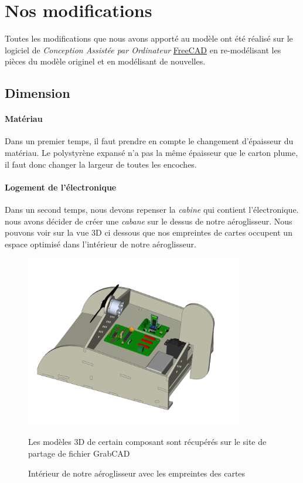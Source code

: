 		\section{Nos modifications}
		Toutes les modifications que nous avons apporté au modèle ont été réalisé sur le logiciel de \textit{Conception Assistée par Ordinateur} \href{https://freecadweb.org/}{FreeCAD} en re-modélisant les pièces du modèle originel et en modélisant de nouvelles.
			\subsection{Dimension}
				\paragraph{Matériau}Dans un premier temps, il faut prendre en compte le changement d'épaisseur du matériau. Le polystyrène expansé n'a pas la même épaisseur que le carton plume, il faut donc changer la largeur de toutes les encoches.
				\paragraph{Logement de l'électronique} Dans un second temps, nous devons repenser la \textit{cabine} qui contient l'électronique. nous avons décider de créer une \textit{cabane} sur le dessus de notre aéroglisseur. Nous pouvons voir sur la vue 3D ci dessous que nos empreintes de cartes occupent un espace optimisé dans l'intérieur de notre aéroglisseur.
				\begin{figure}[h]
					\begin{center}
						\includegraphics[width=0.85\textwidth]{../Illus/vueInterne.png}
					\end{center}
					\caption{Intérieur de notre aéroglisseur avec les empreintes des cartes}
					\small Les modèles 3D de certain composant sont récupérés sur le site de partage de fichier GrabCAD\cite{grabcad}
					\label{MEPnous}
				\end{figure}
